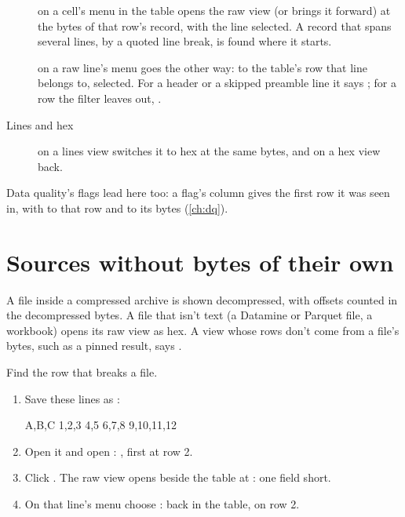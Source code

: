 \begin{description}
\item[] on a cell's menu in the table opens the raw view (or brings it forward) at the bytes
of that row's record, with the line selected. A record that spans several lines, by a quoted line break,
is found where it starts.
\item[] on a raw line's menu goes the other way: to the table's row that line belongs
to, selected. For a header or a skipped preamble line it says
; for a row the filter leaves out,
.
\item[Lines and hex]  on a lines view switches it to hex at the same
bytes, and  on a hex view back.
\end{description}

Data quality's flags lead here too: a flag's  column gives the first row it was seen in,
with  to that row and  to its bytes (\cref{ch:dq}).

\section{Sources without bytes of their own}

A file inside a compressed archive is shown decompressed, with offsets counted in the decompressed bytes.
A file that isn't text (a Datamine or Parquet file, a workbook) opens its raw view as hex. A view whose
rows don't come from a file's bytes, such as a pinned result, says .

\begin{tryit}
Find the row that breaks a file.
\begin{enumerate}
\item Save these lines as :
\begin{codeblock}
A,B,C
1,2,3
4,5
6,7,8
9,10,11,12
\end{codeblock}
\item Open it and open : , first at row 2.
\item Click . The raw view opens beside the table at : one field short.
\item On that line's menu choose : back in the table, on row 2.
\end{enumerate}
\end{tryit}
